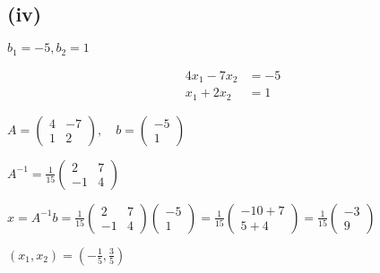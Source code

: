 \subsection*{(iv)} $b_1 = -5, b_2 = 1$

\begin{align}
	4x_1 - 7x_2 & = -5 \\
	x_1 + 2x_2  & = 1
\end{align}

$A = \begin{pmatrix}
	4 & -7 \\
	1 & 2
\end{pmatrix}, \quad b = \begin{pmatrix}
	-5 \\
	1
\end{pmatrix}$

$A^{-1} = \frac{1}{15}\begin{pmatrix}
	2 & 7 \\
	-1 & 4
\end{pmatrix}$

$x = A^{-1}b = \frac{1}{15}\begin{pmatrix}
	2 & 7 \\
	-1 & 4
\end{pmatrix}\begin{pmatrix}
	-5 \\
	1
\end{pmatrix} = \frac{1}{15}\begin{pmatrix}
	-10 + 7 \\
	5 + 4
\end{pmatrix} = \frac{1}{15}\begin{pmatrix}
	-3 \\
	9
\end{pmatrix}$

$\boxed{(x_1, x_2) = \left(-\frac{1}{5}, \frac{3}{5}\right)}$